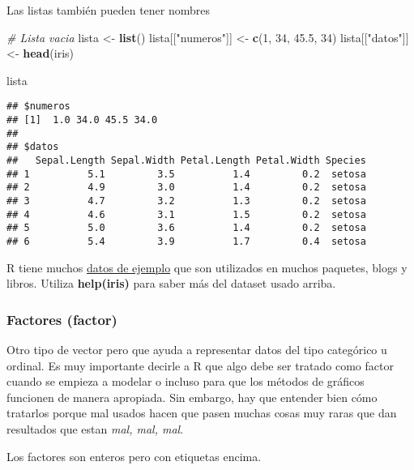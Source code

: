 \documentclass[]{article}
\newenvironment{Shaded}{\begin{snugshade}}{\end{snugshade}}
\newcommand{\KeywordTok}[1]{\textcolor[rgb]{0.13,0.29,0.53}{\textbf{{#1}}}}
\newcommand{\DecValTok}[1]{\textcolor[rgb]{0.00,0.00,0.81}{{#1}}}
\newcommand{\FloatTok}[1]{\textcolor[rgb]{0.00,0.00,0.81}{{#1}}}
\newcommand{\StringTok}[1]{\textcolor[rgb]{0.31,0.60,0.02}{{#1}}}
\newcommand{\CommentTok}[1]{\textcolor[rgb]{0.56,0.35,0.01}{\textit{{#1}}}}
\newcommand{\NormalTok}[1]{{#1}}
\begin{document}
Las listas también pueden tener nombres

\begin{Shaded}
\begin{Highlighting}[]
\CommentTok{# Lista vacia}
\NormalTok{lista <-}\StringTok{ }\KeywordTok{list}\NormalTok{()}
\NormalTok{lista[[}\StringTok{"numeros"}\NormalTok{]] <-}\StringTok{ }\KeywordTok{c}\NormalTok{(}\DecValTok{1}\NormalTok{, }\DecValTok{34}\NormalTok{, }\FloatTok{45.5}\NormalTok{, }\DecValTok{34}\NormalTok{) }
\NormalTok{lista[[}\StringTok{"datos"}\NormalTok{]] <-}\StringTok{ }\KeywordTok{head}\NormalTok{(iris)}

\NormalTok{lista}
\end{Highlighting}
\end{Shaded}

\begin{verbatim}
## $numeros
## [1]  1.0 34.0 45.5 34.0
## 
## $datos
##   Sepal.Length Sepal.Width Petal.Length Petal.Width Species
## 1          5.1         3.5          1.4         0.2  setosa
## 2          4.9         3.0          1.4         0.2  setosa
## 3          4.7         3.2          1.3         0.2  setosa
## 4          4.6         3.1          1.5         0.2  setosa
## 5          5.0         3.6          1.4         0.2  setosa
## 6          5.4         3.9          1.7         0.4  setosa
\end{verbatim}

\begin{curiosidad}
R tiene muchos \href{https://stat.ethz.ch/R-manual/R-devel/library/datasets/html/00Index.html}{datos de ejemplo}
que son utilizados en muchos paquetes, blogs y libros. Utiliza {\bf help(iris)} para
saber más del dataset usado arriba.
\end{curiosidad}

\subsubsection{Factores (factor)}\label{factores-factor}

Otro tipo de vector pero que ayuda a representar datos del tipo
categórico u ordinal. Es muy importante decirle a R que algo debe ser
tratado como factor cuando se empieza a modelar o incluso para que los
métodos de gráficos funcionen de manera apropiada. Sin embargo, hay que
entender bien cómo tratarlos porque mal usados hacen que pasen muchas
cosas muy raras que dan resultados que estan \emph{mal, mal, mal}.

Los factores son enteros pero con etiquetas encima.
\end{document}
